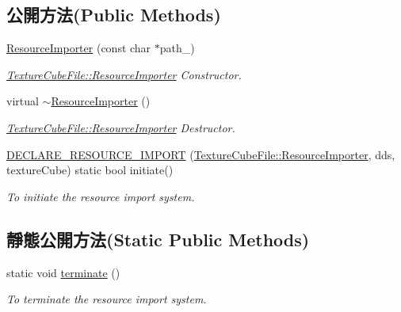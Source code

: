 \subsection*{公開方法(Public Methods)}
\begin{DoxyCompactItemize}
\item 
\hyperlink{class_magnum_1_1_texture_cube_file_1_1_resource_importer_a15d6b6891f925ed9c04921d200f97f91}{Resource\+Importer} (const char $\ast$path\+\_\+)
\begin{DoxyCompactList}\small\item\em \hyperlink{class_magnum_1_1_texture_cube_file_1_1_resource_importer}{Texture\+Cube\+File\+::\+Resource\+Importer} Constructor. \end{DoxyCompactList}\item 
virtual \hyperlink{class_magnum_1_1_texture_cube_file_1_1_resource_importer_ac0bc19f8c53613e420760e75871bbdc7}{$\sim$\+Resource\+Importer} ()
\begin{DoxyCompactList}\small\item\em \hyperlink{class_magnum_1_1_texture_cube_file_1_1_resource_importer}{Texture\+Cube\+File\+::\+Resource\+Importer} Destructor. \end{DoxyCompactList}\item 
\hyperlink{class_magnum_1_1_texture_cube_file_1_1_resource_importer_a38fb09283f9bcde69e5ce9c573d9ddec}{D\+E\+C\+L\+A\+R\+E\+\_\+\+R\+E\+S\+O\+U\+R\+C\+E\+\_\+\+I\+M\+P\+O\+RT} (\hyperlink{class_magnum_1_1_texture_cube_file_1_1_resource_importer}{Texture\+Cube\+File\+::\+Resource\+Importer}, dds, texture\+Cube) static bool initiate()\hypertarget{class_magnum_1_1_texture_cube_file_1_1_resource_importer_a38fb09283f9bcde69e5ce9c573d9ddec}{}\label{class_magnum_1_1_texture_cube_file_1_1_resource_importer_a38fb09283f9bcde69e5ce9c573d9ddec}

\begin{DoxyCompactList}\small\item\em To initiate the resource import system. \end{DoxyCompactList}\end{DoxyCompactItemize}
\subsection*{靜態公開方法(Static Public Methods)}
\begin{DoxyCompactItemize}
\item 
static void \hyperlink{class_magnum_1_1_texture_cube_file_1_1_resource_importer_a65e42146fe50899d8dd7f4bf7eaca9a6}{terminate} ()\hypertarget{class_magnum_1_1_texture_cube_file_1_1_resource_importer_a65e42146fe50899d8dd7f4bf7eaca9a6}{}\label{class_magnum_1_1_texture_cube_file_1_1_resource_importer_a65e42146fe50899d8dd7f4bf7eaca9a6}

\begin{DoxyCompactList}\small\item\em To terminate the resource import system. \end{DoxyCompactList}\end{DoxyCompactItemize}
